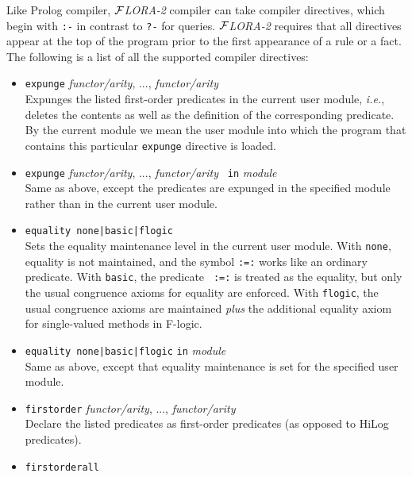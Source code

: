 \documentclass[11pt]{article}
\newcommand{\FLORA}{{\mbox{${\cal F}${\small\it LORA}\rm\emph{-2}}}\xspace}
\newcommand{\fl}{\mbox{F-logic}\xspace}
\begin{document}
%
%
Like Prolog compiler, \FLORA compiler can take compiler directives, which
begin with {\tt :-} in contrast to {\tt ?-} for queries.  \FLORA requires
that all directives appear at the top of the program prior to the first
appearance of a rule or a fact.  The following is a list of all the supported
compiler directives:
\begin{itemize}
\item {\tt expunge} {\em functor/arity}, ..., {\em functor/arity}
  \\
  Expunges the listed first-order predicates in the current user
  module, {\it i.e.}, deletes the contents as well as the definition of the
  corresponding predicate. By the current module we mean the user module into
  which the program that contains this particular {\tt expunge} directive
  is loaded.
\item {\tt expunge} {\em functor/arity}, ..., {\em functor/arity} {\tt
    in} \emph{module}\\
  Same as above, except the predicates are expunged in the specified
    module rather than in the current user module.
  \item {\tt equality none|basic|flogic}
    \\
    Sets the equality maintenance level in the current user module.
    With {\tt none}, equality is not maintained, and the symbol {\tt :=:}
    works like an ordinary predicate.  With {\tt basic}, the predicate {\tt
      :=:} is treated as the equality, but only the usual congruence axioms
    for equality are enforced. With {\tt flogic}, the usual congruence
    axioms are maintained \emph{plus} the additional equality axiom for
    single-valued methods in \fl.
\item {\tt equality none|basic|flogic} {\tt in}  \emph{module}
  \\
  Same as above, except that equality maintenance is set for the specified
  user module.
\item {\tt firstorder} {\em functor/arity}, ..., {\em functor/arity}
  \\
  Declare the listed predicates as first-order predicates (as opposed to HiLog
  predicates).
\item {\tt firstorderall}

\end{itemize}
\end{document}
